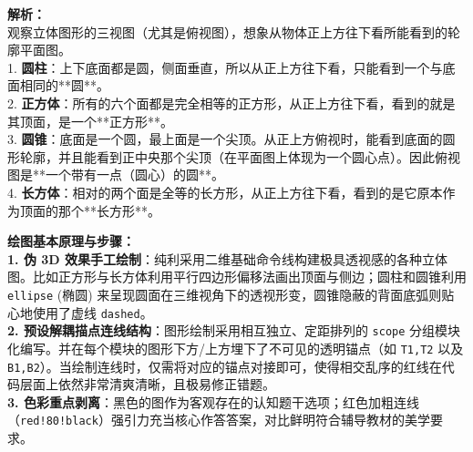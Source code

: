 \vspace{0.8cm}

{\small\color{gray}
\textbf{解析：}\\
观察立体图形的三视图（尤其是俯视图），想象从物体正上方往下看所能看到的轮廓平面图。\\
1. \textbf{圆柱}：上下底面都是圆，侧面垂直，所以从正上方往下看，只能看到一个与底面相同的**圆**。\\
2. \textbf{正方体}：所有的六个面都是完全相等的正方形，从正上方往下看，看到的就是其顶面，是一个**正方形**。\\
3. \textbf{圆锥}：底面是一个圆，最上面是一个尖顶。从正上方俯视时，能看到底面的圆形轮廓，并且能看到正中央那个尖顶（在平面图上体现为一个圆心点）。因此俯视图是**一个带有一点（圆心）的圆**。\\
4. \textbf{长方体}：相对的两个面是全等的长方形，从正上方往下看，看到的是它原本作为顶面的那个**长方形**。
}

\vspace{0.6cm}

{\small\color{blue!70!black}
\textbf{绘图基本原理与步骤：}\\
\textbf{1. 伪 3D 效果手工绘制}：纯利采用二维基础命令线构建极具透视感的各种立体图。比如正方形与长方体利用平行四边形偏移法画出顶面与侧边；圆柱和圆锥利用 \texttt{ellipse} (椭圆) 来呈现圆面在三维视角下的透视形变，圆锥隐蔽的背面底弧则贴心地使用了虚线 \texttt{dashed}。\\
\textbf{2. 预设解耦描点连线结构}：图形绘制采用相互独立、定距排列的 \texttt{scope} 分组模块化编写。并在每个模块的图形下方/上方埋下了不可见的透明锚点（如 \texttt{T1,T2} 以及 \texttt{B1,B2}）。当绘制连线时，仅需将对应的锚点对接即可，使得相交乱序的红线在代码层面上依然非常清爽清晰，且极易修正错题。\\
\textbf{3. 色彩重点剥离}：黑色的图作为客观存在的认知题干选项；红色加粗连线（\texttt{red!80!black}）强引力充当核心作答答案，对比鲜明符合辅导教材的美学要求。
}


\newpage
